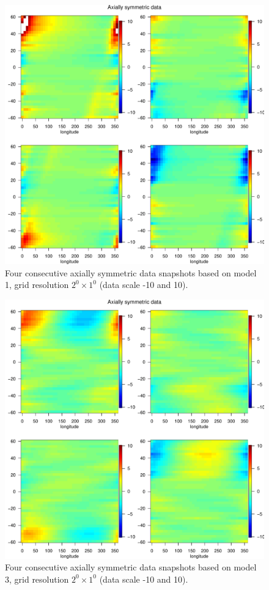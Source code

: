 % 
% 

\begin{figure}[H]
\label{grid_plot_model1}
\begin{center}
\includegraphics [scale=.8]{graphs/Data_sample_120_model1.pdf}
\caption*{Four consecutive axially symmetric data snapshots based on model 1, grid resolution $2^0\times 1^0$ (data scale -10 and 10).}
\end{center}
\end{figure}


\begin{figure}[H]
\label{grid_plot_model3}
\begin{center}
\includegraphics [scale=.8]{graphs/Data_sample_120_model3.pdf}
\caption*{Four consecutive axially symmetric data snapshots based on model 3, grid resolution $2^0\times 1^0$ (data scale -10 and 10).}
\end{center}
\end{figure}
